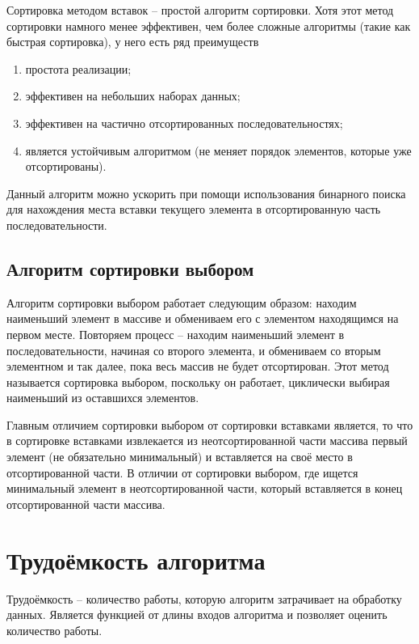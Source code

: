             Сортировка методом вставок -- простой алгоритм сортировки. 
            Хотя этот метод сортировки намного менее эффективен,
            чем более сложные алгоритмы (такие как быстрая сортировка), у него есть ряд преимуществ
            \begin{enumerate}
                \item простота реализации;
                \item эффективен на небольших наборах данных;
                \item эффективен на частично отсортированных последовательностях;
                \item является устойчивым алгоритмом (не меняет порядок элементов, которые уже отсортированы).
            \end{enumerate}

            Данный алгоритм можно ускорить при помощи использования бинарного поиска для нахождения места
            вставки текущего элемента в отсортированную часть последовательности.

        \subsection{ Алгоритм сортировки выбором}
            Алгоритм сортировки выбором работает следующим образом: 
            находим наименьший элемент в массиве и обмениваем его с элементом находящимся на первом месте.
            Повторяем процесс -- находим наименьший элемент в последовательности, начиная со второго элемента, и
            обмениваем со вторым элементном и так далее, пока весь массив не будет отсортирован.
            Этот метод называется сортировка выбором, поскольку он работает, 
            циклически выбирая наименьший из оставшихся элементов.

            Главным отличием сортировки выбором от сортировки вставками является, то что в сортировке вставками 
            извлекается из неотсортированной части массива первый элемент (не обязательно минимальный) и
            вставляется на своё место в отсортированной части.
            В отличии от сортировки выбором, где ищется минимальный элемент 
            в неотсортированной части,  который вставляется в конец отсортированной части массива.


    \section{Трудоёмкость алгоритма}
        Трудоёмкость -- количество работы, которую алгоритм затрачивает на обработку данных.
        Является функцией от длины входов алгоритма и позволяет оценить количество работы.

